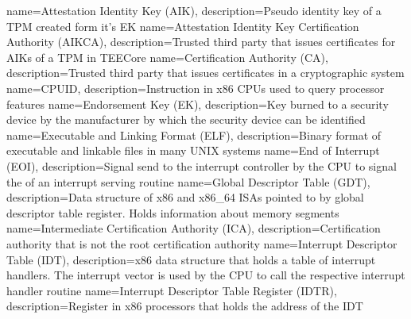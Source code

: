 
%
{
  name=Attestation Identity Key (AIK),
  description={Pseudo identity key of a TPM created form it's EK}
}
{
  name=Attestation Identity Key Certification Authority (AIKCA),
  description={Trusted third party that issues certificates for AIKs of a TPM in TEECore}
}
%
{
  name=Certification Authority (CA),
  description={Trusted third party that issues certificates in a cryptographic system}
}
{
  name=CPUID,
  description={Instruction in x86 CPUs used to query processor features}
}
%
{
  name=Endorsement Key (EK),
  description={Key burned to a security device by the manufacturer by which the security device can be identified}
}
{
  name=Executable and Linking Format (ELF),
  description={Binary format of executable and linkable files in many UNIX systems}
}
{
  name=End of Interrupt (EOI),
  description={Signal send to the interrupt controller by the CPU to signal the of an interrupt serving routine}
}
%
{
  name=Global Descriptor Table (GDT),
  description={Data structure of x86 and x86\_64 ISAs pointed to by global descriptor table register.
  Holds information about memory segments}
}
%
{
  name=Intermediate Certification Authority (ICA),
  description={Certification authority that is not the root certification authority}
}
{
  name=Interrupt Descriptor Table (IDT),
  description={x86 data structure that holds a table of interrupt handlers. The interrupt vector is used by the CPU to
  call the respective interrupt handler routine}
}
{
  name=Interrupt Descriptor Table Register (IDTR),
  description={Register in x86 processors that holds the address of the IDT}
}
